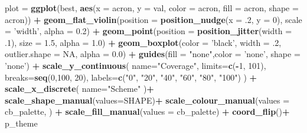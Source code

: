 \documentclass[]{book}
\newenvironment{Shaded}{\begin{snugshade}}{\end{snugshade}}
\newcommand{\DataTypeTok}[1]{\textcolor[rgb]{0.13,0.29,0.53}{#1}}
\newcommand{\DecValTok}[1]{\textcolor[rgb]{0.00,0.00,0.81}{#1}}
\newcommand{\FloatTok}[1]{\textcolor[rgb]{0.00,0.00,0.81}{#1}}
\newcommand{\KeywordTok}[1]{\textcolor[rgb]{0.13,0.29,0.53}{\textbf{#1}}}
\newcommand{\NormalTok}[1]{#1}
\newcommand{\OperatorTok}[1]{\textcolor[rgb]{0.81,0.36,0.00}{\textbf{#1}}}
\newcommand{\OtherTok}[1]{\textcolor[rgb]{0.56,0.35,0.01}{#1}}
\newcommand{\StringTok}[1]{\textcolor[rgb]{0.31,0.60,0.02}{#1}}
\begin{document}
\begin{Shaded}
\begin{Highlighting}[]
\NormalTok{plot =}\StringTok{ }\KeywordTok{ggplot}\NormalTok{(best, }\KeywordTok{aes}\NormalTok{(}\DataTypeTok{x =}\NormalTok{ acron, }\DataTypeTok{y =}\NormalTok{ val, }\DataTypeTok{color =}\NormalTok{ acron, }\DataTypeTok{fill =}\NormalTok{ acron, }\DataTypeTok{shape =}\NormalTok{ acron)) }\OperatorTok{+}
\StringTok{  }\KeywordTok{geom_flat_violin}\NormalTok{(}\DataTypeTok{position =} \KeywordTok{position_nudge}\NormalTok{(}\DataTypeTok{x =} \FloatTok{.2}\NormalTok{, }\DataTypeTok{y =} \DecValTok{0}\NormalTok{), }\DataTypeTok{scale =} \StringTok{'width'}\NormalTok{, }\DataTypeTok{alpha =} \FloatTok{0.2}\NormalTok{) }\OperatorTok{+}
\StringTok{  }\KeywordTok{geom_point}\NormalTok{(}\DataTypeTok{position =} \KeywordTok{position_jitter}\NormalTok{(}\DataTypeTok{width =} \FloatTok{.1}\NormalTok{), }\DataTypeTok{size =} \FloatTok{1.5}\NormalTok{, }\DataTypeTok{alpha =} \FloatTok{1.0}\NormalTok{) }\OperatorTok{+}
\StringTok{  }\KeywordTok{geom_boxplot}\NormalTok{(}\DataTypeTok{color =} \StringTok{'black'}\NormalTok{, }\DataTypeTok{width =} \FloatTok{.2}\NormalTok{, }\DataTypeTok{outlier.shape =} \OtherTok{NA}\NormalTok{, }\DataTypeTok{alpha =} \FloatTok{0.0}\NormalTok{) }\OperatorTok{+}
\StringTok{  }\KeywordTok{guides}\NormalTok{(}\DataTypeTok{fill =} \StringTok{"none"}\NormalTok{,}\DataTypeTok{color =} \StringTok{'none'}\NormalTok{, }\DataTypeTok{shape =} \StringTok{'none'}\NormalTok{) }\OperatorTok{+}
\StringTok{  }\KeywordTok{scale_y_continuous}\NormalTok{(}
    \DataTypeTok{name=}\StringTok{"Coverage"}\NormalTok{,}
    \DataTypeTok{limits=}\KeywordTok{c}\NormalTok{(}\OperatorTok{-}\DecValTok{1}\NormalTok{, }\DecValTok{101}\NormalTok{),}
    \DataTypeTok{breaks=}\KeywordTok{seq}\NormalTok{(}\DecValTok{0}\NormalTok{,}\DecValTok{100}\NormalTok{, }\DecValTok{20}\NormalTok{),}
    \DataTypeTok{labels=}\KeywordTok{c}\NormalTok{(}\StringTok{"0"}\NormalTok{, }\StringTok{"20"}\NormalTok{, }\StringTok{"40"}\NormalTok{, }\StringTok{"60"}\NormalTok{, }\StringTok{"80"}\NormalTok{, }\StringTok{"100"}\NormalTok{)}
\NormalTok{  ) }\OperatorTok{+}
\StringTok{  }\KeywordTok{scale_x_discrete}\NormalTok{(}
    \DataTypeTok{name=}\StringTok{"Scheme"}
\NormalTok{  )}\OperatorTok{+}
\StringTok{  }\KeywordTok{scale_shape_manual}\NormalTok{(}\DataTypeTok{values=}\NormalTok{SHAPE)}\OperatorTok{+}
\StringTok{  }\KeywordTok{scale_colour_manual}\NormalTok{(}\DataTypeTok{values =}\NormalTok{ cb_palette, ) }\OperatorTok{+}
\StringTok{  }\KeywordTok{scale_fill_manual}\NormalTok{(}\DataTypeTok{values =}\NormalTok{ cb_palette) }\OperatorTok{+}
\StringTok{  }\KeywordTok{coord_flip}\NormalTok{()}\OperatorTok{+}
\StringTok{  }\NormalTok{p_theme}


\end{Highlighting}
\end{Shaded}
\end{document}
